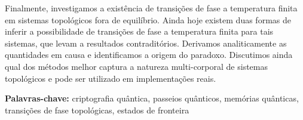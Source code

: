 Finalmente, investigamos a exist\^{e}ncia de transi\c{c}\~{o}es de fase a temperatura finita em sistemas topol\'{o}gicos fora de equil\'{i}brio. Ainda hoje existem duas formas de inferir a possibilidade de transi\c{c}\~{o}es de fase a temperatura finita para tais sistemas, que levam a resultados contradit\'{o}rios. Derivamos analiticamente as quantidades em causa e identificamos a origem do paradoxo. Discutimos ainda qual dos m\'{e}todos melhor captura a natureza multi-corporal de sistemas topol\'{o}gicos e pode ser utilizado em implementa\c{c}\~{o}es reais.

\vfill
\begin{flushleft}
\textbf{Palavras-chave:} criptografia qu\^{a}ntica, passeios qu\^{a}nticos, mem\'{o}rias qu\^{a}nticas, transi\c{c}\~{o}es de fase topol\'{o}gicas, estados de fronteira
\end{flushleft}
